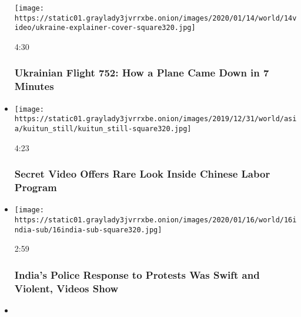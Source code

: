 \begin{itemize}
  \texttt{[image: https://static01.graylady3jvrrxbe.onion/images/2020/01/14/world/14video/ukraine-explainer-cover-square320.jpg]}

  4:30

  \hypertarget{ukrainian-flight-752-how-a-plane-came-down-in-7-minutes}{%
  \subsubsection{Ukrainian Flight 752: How a Plane Came Down in 7
  Minutes}\label{ukrainian-flight-752-how-a-plane-came-down-in-7-minutes}}
\item
  \href{https://www.nytimes3xbfgragh.onion/video/world/asia/100000006874372/chinese-labor-uighurs.html?action=click\&module=video-series-bar\&region=header\&pgtype=Article\&playlistId=video/investigations}{}

  \texttt{[image: https://static01.graylady3jvrrxbe.onion/images/2019/12/31/world/asia/kuitun\_still/kuitun\_still-square320.jpg]}

  4:23

  \hypertarget{secret-video-offers-rare-look-inside-chinese-labor-program}{%
  \subsubsection{Secret Video Offers Rare Look Inside Chinese Labor
  Program}\label{secret-video-offers-rare-look-inside-chinese-labor-program}}
\item
  \href{https://www.nytimes3xbfgragh.onion/video/world/asia/100000006877279/india-protests-police.html?action=click\&module=video-series-bar\&region=header\&pgtype=Article\&playlistId=video/investigations}{}

  \texttt{[image: https://static01.graylady3jvrrxbe.onion/images/2020/01/16/world/16india-sub/16india-sub-square320.jpg]}

  2:59

  \hypertarget{indias-police-response-to-protests-was-swift-and-violent-videos-show}{%
  \subsubsection{India's Police Response to Protests Was Swift and
  Violent, Videos
  Show}\label{indias-police-response-to-protests-was-swift-and-violent-videos-show}}
\item
  \href{https://www.nytimes3xbfgragh.onion/video/world/middleeast/100000006818506/russia-bombs-syria-civlians.html?action=click\&module=video-series-bar\&region=header\&pgtype=Article\&playlistId=video/investigations}{}


\end{itemize}
